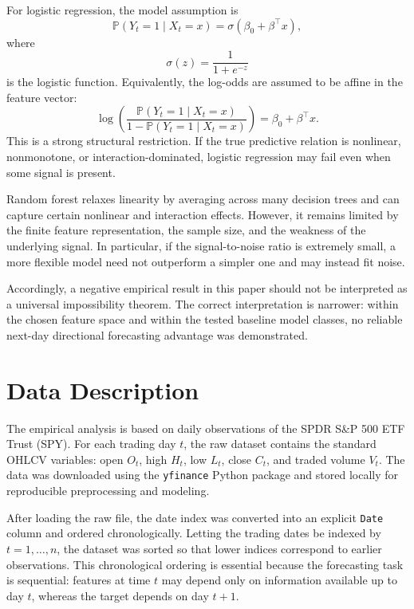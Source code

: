 \documentclass[11pt,a4paper]{article}
\begin{document}
	For logistic regression, the model assumption is
	\[
	\mathbb{P}(Y_t = 1 \mid X_t = x)
	= \sigma(\beta_0 + \beta^\top x),
	\]
	where
	\[
	\sigma(z) = \frac{1}{1 + e^{-z}}
	\]
	is the logistic function. Equivalently, the log-odds are assumed to be affine in the feature vector:
	\[
	\log\!\left(\frac{\mathbb{P}(Y_t = 1 \mid X_t = x)}{1 - \mathbb{P}(Y_t = 1 \mid X_t = x)}\right)
	= \beta_0 + \beta^\top x.
	\]
	This is a strong structural restriction. If the true predictive relation is nonlinear, nonmonotone, or interaction-dominated, logistic regression may fail even when some signal is present.
	
	Random forest relaxes linearity by averaging across many decision trees and can capture certain nonlinear and interaction effects. However, it remains limited by the finite feature representation, the sample size, and the weakness of the underlying signal. In particular, if the signal-to-noise ratio is extremely small, a more flexible model need not outperform a simpler one and may instead fit noise.
	
	Accordingly, a negative empirical result in this paper should not be interpreted as a universal impossibility theorem. The correct interpretation is narrower: within the chosen feature space and within the tested baseline model classes, no reliable next-day directional forecasting advantage was demonstrated.
	
	\section{Data Description}
	
	The empirical analysis is based on daily observations of the SPDR S\&P 500 ETF Trust (SPY). For each trading day \(t\), the raw dataset contains the standard OHLCV variables: open \(O_t\), high \(H_t\), low \(L_t\), close \(C_t\), and traded volume \(V_t\). The data was downloaded using the \texttt{yfinance} Python package and stored locally for reproducible preprocessing and modeling.
	
	After loading the raw file, the date index was converted into an explicit \texttt{Date} column and ordered chronologically. Letting the trading dates be indexed by \(t=1,\dots,n\), the dataset was sorted so that lower indices correspond to earlier observations. This chronological ordering is essential because the forecasting task is sequential: features at time \(t\) may depend only on information available up to day \(t\), whereas the target depends on day \(t+1\).
	
\end{document}
